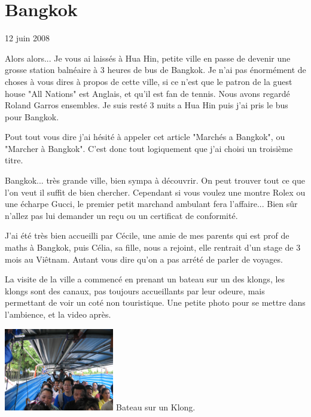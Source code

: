 \section{Bangkok}

12 juin 2008

\begin{multicols}{2}

Alors alors... Je vous ai laissés à Hua Hin, petite ville en passe de devenir une grosse station balnéaire à 3 heures de bus de Bangkok. Je n'ai pas énormément de choses à vous dires à propos de cette ville, si ce n'est que le patron de la guest house "All Nations" est Anglais, et qu'il est fan de tennis. Nous avons regardé Roland Garros ensembles. Je suis resté 3 nuits a Hua Hin puis j'ai pris le bus pour Bangkok.

Pout tout vous dire j'ai hésité à appeler cet article "Marchés a Bangkok", ou "Marcher à Bangkok". C'est donc tout logiquement que j'ai choisi un troisième titre.

Bangkok... très grande ville, bien sympa à découvrir. On peut trouver tout ce que l'on veut il suffit de bien chercher. Cependant si vous voulez une montre Rolex ou une écharpe Gucci, le premier petit marchand ambulant fera l'affaire... Bien sûr n'allez pas lui demander un reçu ou un certificat de conformité.

J'ai été très bien accueilli par Cécile, une amie de mes parents qui est prof de maths à Bangkok, puis Célia, sa fille, nous a rejoint, elle rentrait d'un stage de 3 mois au Viêtnam. Autant vous dire qu'on a pas arrété de parler de voyages.

La visite de la ville a commencé en prenant un bateau sur un des klongs, les klongs sont des canaux, pas toujours accueillants par leur odeure, mais permettant de voir un coté non touristique. Une petite photo pour se mettre dans l'ambience, et la video après.

\hspace*{-0.65cm}
\includegraphics[width=4.8cm]{articles/Bangkok/1345.jpg}
Bateau sur un Klong.



\end{multicols}
